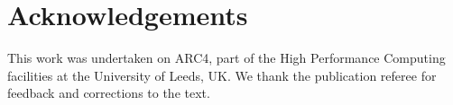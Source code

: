 \documentclass[fleqn,usenatbib]{mnras}
\begin{document}
\section{Acknowledgements}

This work was undertaken on ARC4, part of the High Performance Computing facilities at the University of Leeds, UK.
We thank the publication referee for feedback and corrections to the text.





\bsp	%
\label{lastpage}
\end{document}
